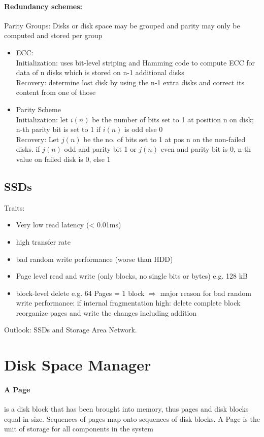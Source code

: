     \paragraph{Redundancy schemes:}
    Parity Groups: Disks or disk space may be grouped and parity may only be computed and stored per group
    \begin{itemize}
        \item ECC: \\
        Initialization: uses bit-level striping and Hamming code to compute ECC for data of n disks which is stored on n-1 additional disks \\
        Recovery: determine lost disk by using the n-1 extra disks and correct its content from one of those
        \item Parity Scheme \\
        Initialization: let $i(n)$ be the number of bits set to 1 at position n on disk; n-th parity bit is set to 1 if $i(n)$ is odd else 0 \\
        Recovery: Let $j(n)$ be the no. of bits set to 1 at pos n on the non-failed disks. if $j(n)$ odd and parity bit 1 or $j(n)$ even and parity bit is 0, n-th value on failed disk is 0, else 1
    \end{itemize}
    
    \subsection{SSDs}
    Traits:
    \begin{itemize}
        \item Very low read latency (< 0.01ms)
        \item high transfer rate
        \item bad random write performance (worse than HDD)
        \item Page level read and write (only blocks, no single bits or bytes) e.g. 128 kB
        \item block-level delete e.g. 64 Pages = 1 block $\Rightarrow$ major reason for bad random write performance: if internal fragmentation high: delete complete block reorganize pages and write the changes including addition
    \end{itemize}
    Outlook: SSDs and Storage Area Network.

\section{Disk Space Manager}
   \paragraph{A Page} is a disk block that has been brought into memory, thus pages and disk blocks equal in size. Sequences of pages map onto sequences of disk blocks. A Page is the unit of storage for all components in the system \\

